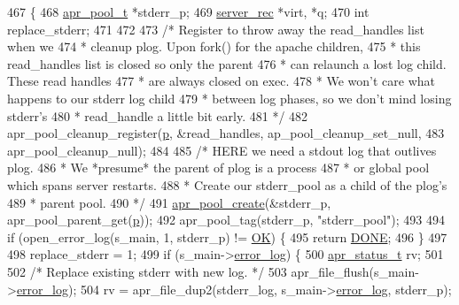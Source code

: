 \begin{DoxyCode}
467 \{
468     \hyperlink{structapr__pool__t}{apr\_pool\_t} *stderr\_p;
469     \hyperlink{structserver__rec}{server\_rec} *virt, *q;
470     \textcolor{keywordtype}{int} replace\_stderr;
471 
472 
473     \textcolor{comment}{/* Register to throw away the read\_handles list when we}
474 \textcolor{comment}{     * cleanup plog.  Upon fork() for the apache children,}
475 \textcolor{comment}{     * this read\_handles list is closed so only the parent}
476 \textcolor{comment}{     * can relaunch a lost log child.  These read handles}
477 \textcolor{comment}{     * are always closed on exec.}
478 \textcolor{comment}{     * We won't care what happens to our stderr log child}
479 \textcolor{comment}{     * between log phases, so we don't mind losing stderr's}
480 \textcolor{comment}{     * read\_handle a little bit early.}
481 \textcolor{comment}{     */}
482     apr\_pool\_cleanup\_register(\hyperlink{group__APACHE__CORE__MPM_ga5cd91701e5c167f2b1a38e70ab57817e}{p}, &read\_handles, ap\_pool\_cleanup\_set\_null,
483                               apr\_pool\_cleanup\_null);
484 
485     \textcolor{comment}{/* HERE we need a stdout log that outlives plog.}
486 \textcolor{comment}{     * We *presume* the parent of plog is a process}
487 \textcolor{comment}{     * or global pool which spans server restarts.}
488 \textcolor{comment}{     * Create our stderr\_pool as a child of the plog's}
489 \textcolor{comment}{     * parent pool.}
490 \textcolor{comment}{     */}
491     \hyperlink{group__apr__pools_gaa7c40921aae156b665e82b0a66991a39}{apr\_pool\_create}(&stderr\_p, apr\_pool\_parent\_get(\hyperlink{group__APACHE__CORE__MPM_ga5cd91701e5c167f2b1a38e70ab57817e}{p}));
492     apr\_pool\_tag(stderr\_p, \textcolor{stringliteral}{"stderr\_pool"});
493 
494     \textcolor{keywordflow}{if} (open\_error\_log(s\_main, 1, stderr\_p) != \hyperlink{group__APACHE__CORE__DAEMON_gaba51915c87d64af47fb1cc59348961c9}{OK}) \{
495         \textcolor{keywordflow}{return} \hyperlink{group__APACHE__CORE__DAEMON_gabe6b865c045f3e7c6892ef4f15ff5779}{DONE};
496     \}
497 
498     replace\_stderr = 1;
499     \textcolor{keywordflow}{if} (s\_main->\hyperlink{structserver__rec_a6b75cc308c1ea6dc45050badeaca804b}{error\_log}) \{
500         \hyperlink{group__apr__errno_gaa5105fa83cc322f09382292db8b47593}{apr\_status\_t} rv;
501 
502         \textcolor{comment}{/* Replace existing stderr with new log. */}
503         apr\_file\_flush(s\_main->\hyperlink{structserver__rec_a6b75cc308c1ea6dc45050badeaca804b}{error\_log});
504         rv = apr\_file\_dup2(stderr\_log, s\_main->\hyperlink{structserver__rec_a6b75cc308c1ea6dc45050badeaca804b}{error\_log}, stderr\_p);

\end{DoxyCode}
